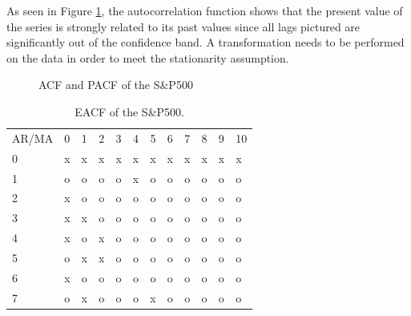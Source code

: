 \documentclass[12pt, centerh1]{article}
\begin{document}
As seen in Figure \ref{fig:acf&pacf}, the autocorrelation function shows that the present value of the series is strongly related to its past values since all lags pictured are significantly out of the confidence band. A transformation needs to be performed on the data in order to meet the stationarity assumption.
\begin{figure}[H]%
    \centering
    \qquad
    \caption{ACF and PACF of the S\&P500}%
    \label{fig:acf&pacf}%
\end{figure}

\begin{table}[H]
\centering
\begin{tabular}{lcccccccccll}
AR/MA & 0 & 1 & 2 & 3 & 4 & 5 & 6 & 7 & 8 & 9 & 10 \\
0     & x & x & x & x & x & x & x & x & x & x & x  \\
1     & o & o & o & o & x & o & o & o & o & o & o  \\
2     & x & o & o & o & o & o & o & o & o & o & o  \\
3     & x & x & o & o & o & o & o & o & o & o & o  \\
4     & x & o & x & o & o & o & o & o & o & o & o  \\
5     & o & x & x & o & o & o & o & o & o & o & o  \\
6     & x & o & o & o & o & o & o & o & o & o & o  \\
7     & o & x & o & o & o & x & o & o & o & o & o 
\end{tabular}
\caption{EACF of the S\&P500.}
\label{table:coefficients}
\end{table}
\end{document}
